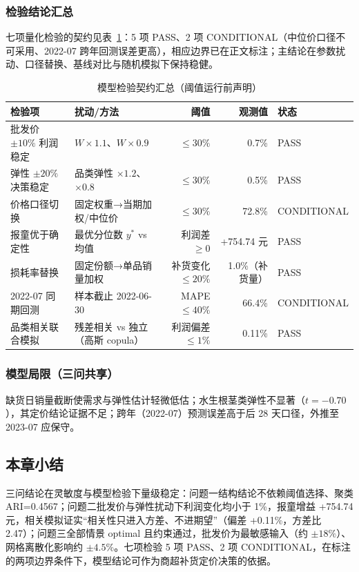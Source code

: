 \subsubsection{检验结论汇总}

七项量化检验的契约见表~\ref{tab:summary}：5 项 PASS、2 项 CONDITIONAL（中位价口径不可采用、2022-07 跨年回测误差更高），相应边界已在正文标注；主结论在参数扰动、口径替换、基线对比与随机模拟下保持稳健。

\begin{table}[htbp]
\centering
\caption{模型检验契约汇总（阈值运行前声明）}
\label{tab:summary}
\begin{tabular}{l l r r l}
\toprule
检验项 & 扰动/方法 & 阈值 & 观测值 & 状态 \\
\midrule
批发价 $\pm10\%$ 利润稳定 & $W\times1.1$、$W\times0.9$ & $\le30\%$ & 0.7\% & PASS \\
弹性 $\pm20\%$ 决策稳定 & 品类弹性 $\times1.2$、$\times0.8$ & $\le30\%$ & 0.5\% & PASS \\
价格口径切换 & 固定权重→当期加权/中位价 & $\le30\%$ & 72.8\% & CONDITIONAL \\
报童优于确定性 & 最优分位数 $y^*$ vs 均值 & 利润差 $\ge0$ & +754.74 元 & PASS \\
损耗率替换 & 固定份额→单品销量加权 & 补货变化 $\le20\%$ & 1.0\%（补货量） & PASS \\
2022-07 同期回测 & 样本截止 2022-06-30 & MAPE $\le40\%$ & 66.4\% & CONDITIONAL \\
品类相关联合模拟 & 残差相关 vs 独立（高斯 copula） & 利润偏差 $\le1\%$ & 0.11\% & PASS \\
\bottomrule
\end{tabular}
\end{table}

\subsubsection{模型局限（三问共享）}

缺货日销量截断使需求与弹性估计轻微低估；水生根茎类弹性不显著（$t=-0.70$），其定价结论证据不足；跨年（2022-07）预测误差高于后 28 天口径，外推至 2023-07 应保守。

\subsection*{本章小结}

三问结论在灵敏度与模型检验下量级稳定：问题一结构结论不依赖阈值选择、聚类 ARI=0.4567；问题二批发价与弹性扰动下利润变化均小于 1\%，报童增益 +754.74 元，相关模拟证实“相关性只进入方差、不进期望”（偏差 +0.11\%，方差比 2.47）；问题三全部情景 optimal 且约束通过，批发价为最敏感输入（约 $\pm18\%$）、网格离散化影响约 $\pm4.5\%$。七项检验 5 项 PASS、2 项 CONDITIONAL，在标注的两项边界条件下，模型结论可作为商超补货定价决策的依据。

